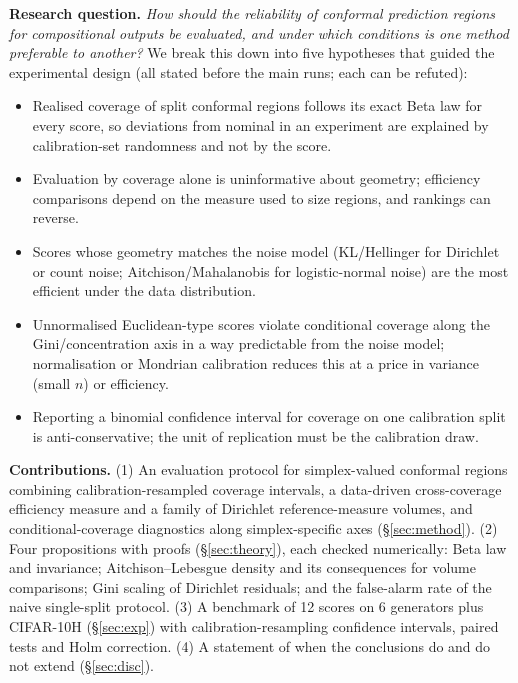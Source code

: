 \documentclass{article}
\begin{document}
\textbf{Research question.} \emph{How should the reliability of conformal prediction regions for compositional outputs be evaluated, and under which conditions is one method preferable to another?} We break this down into five hypotheses that guided the experimental design (all stated before the main runs; each can be refuted):
\begin{itemize}
\item[\textbf{H1}] Realised coverage of split conformal regions follows its exact Beta law for every score, so deviations from nominal in an experiment are explained by calibration-set randomness and not by the score.
\item[\textbf{H2}] Evaluation by coverage alone is uninformative about geometry; efficiency comparisons depend on the measure used to size regions, and rankings can reverse.
\item[\textbf{H3}] Scores whose geometry matches the noise model (KL/Hellinger for Dirichlet or count noise; Aitchison/Mahalanobis for logistic-normal noise) are the most efficient under the data distribution.
\item[\textbf{H4}] Unnormalised Euclidean-type scores violate conditional coverage along the Gini/concentration axis in a way predictable from the noise model; normalisation or Mondrian calibration reduces this at a price in variance (small $n$) or efficiency.
\item[\textbf{H5}] Reporting a binomial confidence interval for coverage on one calibration split is anti-conservative; the unit of replication must be the calibration draw.
\end{itemize}
\textbf{Contributions.} (1) An evaluation protocol for simplex-valued conformal regions combining calibration-resampled coverage intervals, a data-driven cross-coverage efficiency measure and a family of Dirichlet reference-measure volumes, and conditional-coverage diagnostics along simplex-specific axes (\S\ref{sec:method}). (2) Four propositions with proofs (\S\ref{sec:theory}), each checked numerically: Beta law and invariance; Aitchison--Lebesgue density and its consequences for volume comparisons; Gini scaling of Dirichlet residuals; and the false-alarm rate of the naive single-split protocol. (3) A benchmark of 12 scores on 6 generators plus CIFAR-10H (\S\ref{sec:exp}) with calibration-resampling confidence intervals, paired tests and Holm correction. (4) A statement of when the conclusions do and do not extend (\S\ref{sec:disc}).
\end{document}
